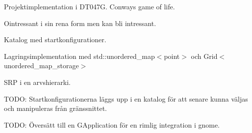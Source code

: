 Projektimplementation i DT047G. Conways game of life.

Ointressant i sin rena form men kan bli intressant.

Katalog med startkonfigurationer.

Lagringsimplementation med std\+::unordered\+\_\+map$<$point$>$ och Grid$<$unordered\+\_\+map\+\_\+storage$>$

SRP i en arvshierarki.

TODO\+: Startkonfigurationerna läggs upp i en katalog för att senare kunna väljas och manipuleras från gränssnittet.

TODO\+: Översätt till en GApplication för en rimlig integration i gnome. 